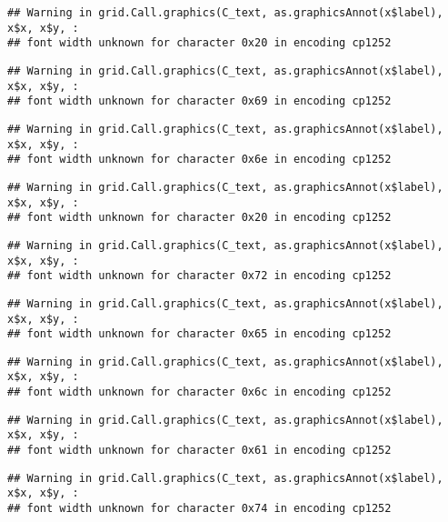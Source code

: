 \documentclass[
]{article}
\begin{document}
\begin{verbatim}
## Warning in grid.Call.graphics(C_text, as.graphicsAnnot(x$label), x$x, x$y, :
## font width unknown for character 0x20 in encoding cp1252
\end{verbatim}

\begin{verbatim}
## Warning in grid.Call.graphics(C_text, as.graphicsAnnot(x$label), x$x, x$y, :
## font width unknown for character 0x69 in encoding cp1252
\end{verbatim}

\begin{verbatim}
## Warning in grid.Call.graphics(C_text, as.graphicsAnnot(x$label), x$x, x$y, :
## font width unknown for character 0x6e in encoding cp1252
\end{verbatim}

\begin{verbatim}
## Warning in grid.Call.graphics(C_text, as.graphicsAnnot(x$label), x$x, x$y, :
## font width unknown for character 0x20 in encoding cp1252
\end{verbatim}

\begin{verbatim}
## Warning in grid.Call.graphics(C_text, as.graphicsAnnot(x$label), x$x, x$y, :
## font width unknown for character 0x72 in encoding cp1252
\end{verbatim}

\begin{verbatim}
## Warning in grid.Call.graphics(C_text, as.graphicsAnnot(x$label), x$x, x$y, :
## font width unknown for character 0x65 in encoding cp1252
\end{verbatim}

\begin{verbatim}
## Warning in grid.Call.graphics(C_text, as.graphicsAnnot(x$label), x$x, x$y, :
## font width unknown for character 0x6c in encoding cp1252
\end{verbatim}

\begin{verbatim}
## Warning in grid.Call.graphics(C_text, as.graphicsAnnot(x$label), x$x, x$y, :
## font width unknown for character 0x61 in encoding cp1252
\end{verbatim}

\begin{verbatim}
## Warning in grid.Call.graphics(C_text, as.graphicsAnnot(x$label), x$x, x$y, :
## font width unknown for character 0x74 in encoding cp1252
\end{verbatim}
\end{document}

